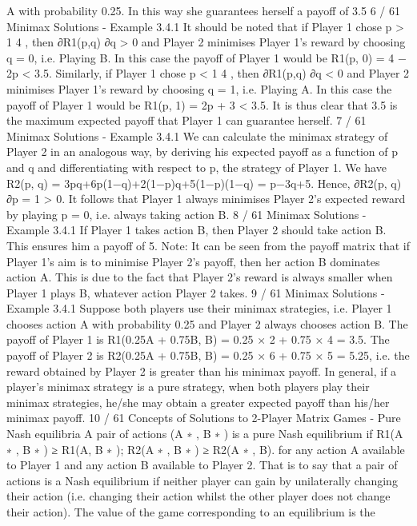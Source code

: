 A with probability 0.25. In this way she guarantees herself a payoff
of 3.5
6 / 61
Minimax Solutions - Example 3.4.1
It should be noted that if Player 1 chose p >
1
4
, then ∂R1(p,q)
∂q > 0
and Player 2 minimises Player 1’s reward by choosing q = 0, i.e.
Playing B.
In this case the payoff of Player 1 would be
R1(p, 0) = 4 − 2p < 3.5.
Similarly, if Player 1 chose p <
1
4
, then ∂R1(p,q)
∂q < 0 and Player 2
minimises Player 1’s reward by choosing q = 1, i.e. Playing A.
In this case the payoff of Player 1 would be
R1(p, 1) = 2p + 3 < 3.5. It is thus clear that 3.5 is the maximum
expected payoff that Player 1 can guarantee herself.
7 / 61
Minimax Solutions - Example 3.4.1
We can calculate the minimax strategy of Player 2 in an analogous
way, by deriving his expected payoff as a function of p and q and
differentiating with respect to p, the strategy of Player 1. We have
R2(p, q) = 3pq+6p(1−q)+2(1−p)q+5(1−p)(1−q) = p−3q+5.
Hence,
∂R2(p, q)
∂p
= 1 > 0.
It follows that Player 1 always minimises Player 2’s expected
reward by playing p = 0, i.e. always taking action B.
8 / 61
Minimax Solutions - Example 3.4.1
If Player 1 takes action B, then Player 2 should take action B.
This ensures him a payoff of 5.
Note: It can be seen from the payoff matrix that if Player 1’s aim
is to minimise Player 2’s payoff, then her action B dominates
action A.
This is due to the fact that Player 2’s reward is always smaller
when Player 1 plays B, whatever action Player 2 takes.
9 / 61
Minimax Solutions - Example 3.4.1
Suppose both players use their minimax strategies, i.e. Player 1
chooses action A with probability 0.25 and Player 2 always chooses
action B.
The payoff of Player 1 is
R1(0.25A + 0.75B, B) = 0.25 × 2 + 0.75 × 4 = 3.5.
The payoff of Player 2 is
R2(0.25A + 0.75B, B) = 0.25 × 6 + 0.75 × 5 = 5.25, i.e. the
reward obtained by Player 2 is greater than his minimax payoff.
In general, if a player’s minimax strategy is a pure strategy, when
both players play their minimax strategies, he/she may obtain a
greater expected payoff than his/her minimax payoff.
10 / 61
Concepts of Solutions to 2-Player Matrix Games - Pure
Nash equilibria
A pair of actions (A
∗
, B
∗
) is a pure Nash equilibrium if
R1(A
∗
, B
∗
) ≥ R1(A, B
∗
); R2(A
∗
, B
∗
) ≥ R2(A
∗
, B).
for any action A available to Player 1 and any action B available
to Player 2.
That is to say that a pair of actions is a Nash equilibrium if neither
player can gain by unilaterally changing their action (i.e. changing
their action whilst the other player does not change their action).
The value of the game corresponding to an equilibrium is the
